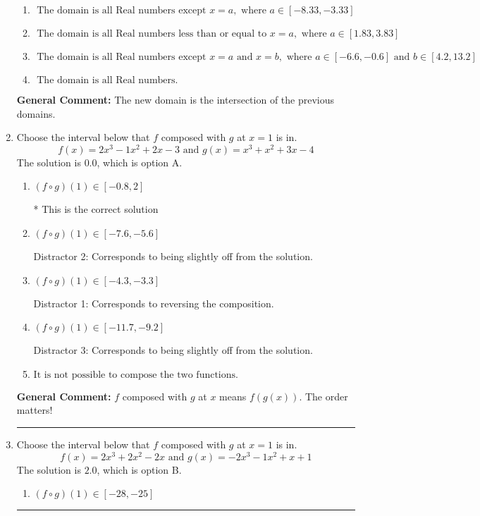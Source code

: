 \documentclass{extbook}[14pt]
\newcommand{\litem}[1]{\item #1

\rule{\textwidth}{0.4pt}}
\begin{document}
\begin{enumerate}
{\begin{enumerate}[label=\Alph*.]
\item \( \text{ The domain is all Real numbers except } x = a, \text{ where } a \in [-8.33, -3.33] \)


\item \( \text{ The domain is all Real numbers less than or equal to } x = a, \text{ where } a \in [1.83, 3.83] \)


\item \( \text{ The domain is all Real numbers except } x = a \text{ and } x = b, \text{ where } a \in [-6.6, -0.6] \text{ and } b \in [4.2, 13.2] \)


\item \( \text{ The domain is all Real numbers. } \)


\end{enumerate}

\textbf{General Comment:} The new domain is the intersection of the previous domains.
}
\litem{
Choose the interval below that $f$ composed with $g$ at $x=1$ is in.
\[ f(x) = 2x^{3} -1 x^{2} +2 x -3 \text{ and } g(x) = x^{3} + x^{2} +3 x -4 \]The solution is \( 0.0 \), which is option A.\begin{enumerate}[label=\Alph*.]
\item \( (f \circ g)(1) \in [-0.8, 2] \)

* This is the correct solution
\item \( (f \circ g)(1) \in [-7.6, -5.6] \)

 Distractor 2: Corresponds to being slightly off from the solution.
\item \( (f \circ g)(1) \in [-4.3, -3.3] \)

 Distractor 1: Corresponds to reversing the composition.
\item \( (f \circ g)(1) \in [-11.7, -9.2] \)

 Distractor 3: Corresponds to being slightly off from the solution.
\item \( \text{It is not possible to compose the two functions.} \)


\end{enumerate}

\textbf{General Comment:} $f$ composed with $g$ at $x$ means $f(g(x))$. The order matters!
}
\litem{
Choose the interval below that $f$ composed with $g$ at $x=1$ is in.
\[ f(x) = 2x^{3} +2 x^{2} -2 x \text{ and } g(x) = -2x^{3} -1 x^{2} +x + 1 \]The solution is \( 2.0 \), which is option B.\begin{enumerate}[label=\Alph*.]
\item \( (f \circ g)(1) \in [-28, -25] \)


\end{enumerate}}
\end{enumerate}
\end{document}
